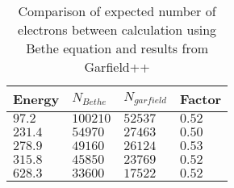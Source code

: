 \begin{table}[ht]%
	\centering
	\caption[Comparison of expected number of electrons between calculation using Bethe equation and results from Garfield++.]
	{Comparison of expected number of electrons between calculation using Bethe equation and results from Garfield++}
	\label{chap3:GarfieldBethe}
	\begin{tabularx}{\linewidth}{XXXX}
		\toprule
		Energy    & \(N_{Bethe}\) & \(N_{garfield}\) & Factor \\
		\midrule
		\(97.2\)  & \(100210\)    & \(52537\)             & \(0.52\)   \\
		\(231.4\) & \(54970\)     & \(27463\)             & \(0.50\)   \\
		\(278.9\) & \(49160\)     & \(26124\)             & \(0.53\)   \\
		\(315.8\) & \(45850\)     & \(23769\)             & \(0.52\)   \\
		\(628.3\) & \(33600\)     & \(17522\)             & \(0.52\)   \\
		\bottomrule
	\end{tabularx}
\end{table}